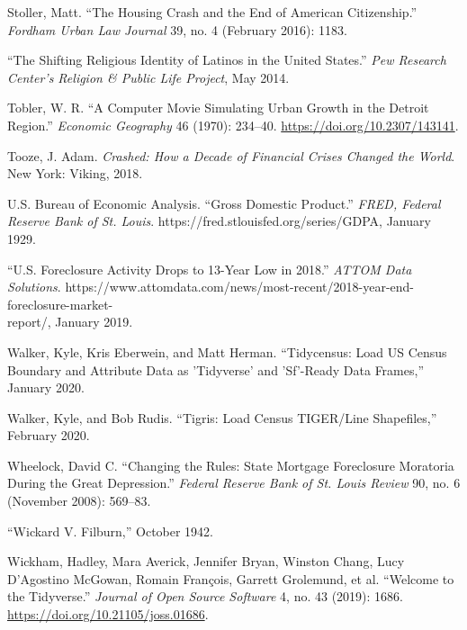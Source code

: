 \documentclass[12pt,oneside]{psthesis}
\begin{document}
\leavevmode\hypertarget{ref-stollerHousingCrashEnd2016}{}%
Stoller, Matt. ``The Housing Crash and the End of American Citizenship.'' \emph{Fordham Urban Law Journal} 39, no. 4 (February 2016): 1183.

\leavevmode\hypertarget{ref-2014shifting}{}%
``The Shifting Religious Identity of Latinos in the United States.'' \emph{Pew Research Center's Religion \& Public Life Project}, May 2014.

\leavevmode\hypertarget{ref-tobler1970computer}{}%
Tobler, W. R. ``A Computer Movie Simulating Urban Growth in the Detroit Region.'' \emph{Economic Geography} 46 (1970): 234--40. \url{https://doi.org/10.2307/143141}.

\leavevmode\hypertarget{ref-toozeCrashedHowDecade2018}{}%
Tooze, J. Adam. \emph{Crashed: How a Decade of Financial Crises Changed the World}. New York: Viking, 2018.

\leavevmode\hypertarget{ref-usbureauofeconomicanalysis1929gross}{}%
U.S. Bureau of Economic Analysis. ``Gross Domestic Product.'' \emph{FRED, Federal Reserve Bank of St. Louis}. https://fred.stlouisfed.org/series/GDPA, January 1929.

\leavevmode\hypertarget{ref-2019foreclosure}{}%
``U.S. Foreclosure Activity Drops to 13-Year Low in 2018.'' \emph{ATTOM Data Solutions}. https://www.attomdata.com/news/most-recent/2018-year-end-foreclosure-market-\\report/, January 2019.

\leavevmode\hypertarget{ref-walker2020tidycensus}{}%
Walker, Kyle, Kris Eberwein, and Matt Herman. ``Tidycensus: Load US Census Boundary and Attribute Data as 'Tidyverse' and 'Sf'-Ready Data Frames,'' January 2020.

\leavevmode\hypertarget{ref-walker2020tigris}{}%
Walker, Kyle, and Bob Rudis. ``Tigris: Load Census TIGER/Line Shapefiles,'' February 2020.

\leavevmode\hypertarget{ref-wheelock2008changing}{}%
Wheelock, David C. ``Changing the Rules: State Mortgage Foreclosure Moratoria During the Great Depression.'' \emph{Federal Reserve Bank of St. Louis Review} 90, no. 6 (November 2008): 569--83.

\leavevmode\hypertarget{ref-1942wickard}{}%
``Wickard V. Filburn,'' October 1942.

\leavevmode\hypertarget{ref-wickham2019welcome}{}%
Wickham, Hadley, Mara Averick, Jennifer Bryan, Winston Chang, Lucy D'Agostino McGowan, Romain François, Garrett Grolemund, et al. ``Welcome to the Tidyverse.'' \emph{Journal of Open Source Software} 4, no. 43 (2019): 1686. \url{https://doi.org/10.21105/joss.01686}.
\end{document}

